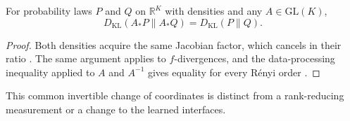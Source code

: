 \documentclass[twoside,11pt]{article}
\begin{document}
\begin{lemma}
\label{lem:glk_invariance}
For probability laws $P$ and $Q$ on $\mathbb R^K$ with densities and any $A\in\mathrm{GL}(K)$,
\begin{equation}
D_{\mathrm{KL}}(A_*P\|A_*Q)=D_{\mathrm{KL}}(P\|Q).
\label{eq:glk_invariance}
\end{equation}
\end{lemma}
\begin{proof}
Both densities acquire the same Jacobian factor, which cancels in their ratio \citep{Amari2016}. The same argument applies to $f$-divergences, and the data-processing inequality applied to $A$ and $A^{-1}$ gives equality for every R\'enyi order \citep[Thm.~9]{vanErvenHarremoes2014}.
\end{proof}
This common invertible change of coordinates is distinct from a rank-reducing measurement or a change to the learned interfaces.
\end{document}
